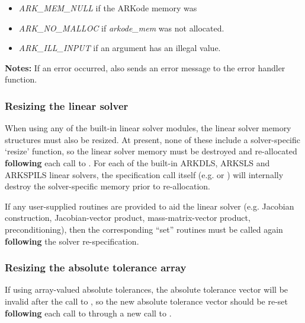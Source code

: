 \documentclass[letterpaper,10pt,english]{sphinxmanual}
\begin{document}
\begin{fulllineitems}
\begin{description}
\begin{itemize}
\item {} 
\emph{ARK\_MEM\_NULL}  if the ARKode memory was 

\item {} 
\emph{ARK\_NO\_MALLOC} if \emph{arkode\_mem} was not allocated.

\item {} 
\emph{ARK\_ILL\_INPUT} if an argument has an illegal value.

\end{itemize}

\end{description}

\textbf{Notes:} If an error occurred, {\hyperref[c_interface/User_callable:ARKodeResize]{}} also sends an error
message to the error handler function.

\end{fulllineitems}



\subsubsection{Resizing the linear solver}
\label{c_interface/User_callable:resizing-the-linear-solver}
When using any of the built-in linear solver modules, the linear
solver memory structures must also be resized.  At present, none of
these include a solver-specific `resize' function, so the linear
solver memory must be destroyed and re-allocated \textbf{following} each
call to {\hyperref[c_interface/User_callable:ARKodeResize]{}}.  For each of the built-in ARKDLS,
ARKSLS and ARKSPILS linear solvers, the specification call itself
(e.g. {\hyperref[c_interface/User_callable:ARKDense]{}} or {\hyperref[c_interface/User_callable:ARKSpgmr]{}}) will internally
destroy the solver-specific memory prior to re-allocation.

If any user-supplied routines are provided to aid the linear solver
(e.g. Jacobian construction, Jacobian-vector product,
mass-matrix-vector product, preconditioning), then the corresponding
``set'' routines must be called again \textbf{following} the solver
re-specification.


\subsubsection{Resizing the absolute tolerance array}
\label{c_interface/User_callable:resizing-the-absolute-tolerance-array}
If using array-valued absolute tolerances, the absolute tolerance
vector will be invalid after the call to {\hyperref[c_interface/User_callable:ARKodeResize]{}}, so
the new absolute tolerance vector should be re-set \textbf{following} each
call to {\hyperref[c_interface/User_callable:ARKodeResize]{}} through a new call to
{\hyperref[c_interface/User_callable:ARKodeSVtolerances]{}}.
\end{document}
